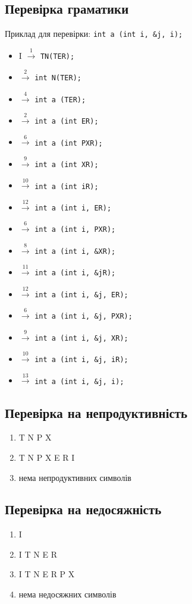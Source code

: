 \subsection{Перевірка граматики}
Приклад для перевірки: \verb|int a (int i, &j, i);|
\begin{itemize}
    \item[]  I $\xrightarrow{1}$ \verb|TN(TER);|
    \item[]  $\xrightarrow{2}$ \verb|int N(TER);|
    \item[]  $\xrightarrow{4}$ \verb|int a (TER);|
    \item[]  $\xrightarrow{2}$ \verb|int a (int ER);|
    \item[]  $\xrightarrow{6}$ \verb|int a (int PXR);|
    \item[]  $\xrightarrow{9}$ \verb|int a (int XR);|
    \item[]  $\xrightarrow{10}$ \verb|int a (int iR);|
    \item[]  $\xrightarrow{12}$ \verb|int a (int i, ER);|
    \item[]  $\xrightarrow{6}$ \verb|int a (int i, PXR);|
    \item[]  $\xrightarrow{8}$ \verb|int a (int i, &XR);|
    \item[]  $\xrightarrow{11}$ \verb|int a (int i, &jR);|
    \item[]  $\xrightarrow{12}$ \verb|int a (int i, &j, ER);|
    \item[]  $\xrightarrow{6}$ \verb|int a (int i, &j, PXR);|
    \item[]  $\xrightarrow{9}$ \verb|int a (int i, &j, XR);|
    \item[]  $\xrightarrow{10}$ \verb|int a (int i, &j, iR);|
    \item[]  $\xrightarrow{13}$ \verb|int a (int i, &j, i);|
\end{itemize}


\newpage
\subsection{Перевірка на непродуктивність}
\begin{enumerate}
    \item  T N P X
    \item  T N P X E R I
    \item  нема непродуктивних символів
\end{enumerate}

\subsection{Перевірка на недосяжність}
\begin{enumerate}
    \item  I
    \item  I T N E R
    \item  I T N E R P X
    \item  нема недосяжних символів
\end{enumerate}




